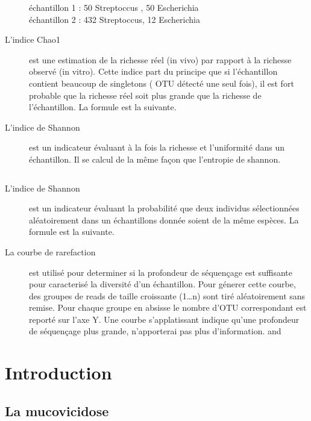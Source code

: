 \documentclass[12pt,a4paper]{article}
\begin{document}
\begin{description}
échantillon 1  : 50 Streptoccus , 50 Escherichia  \\ 
échantillon 2 : 432 Streptoccus, 12 Escherichia 


\item[L'indice Chao1] est une estimation de la richesse réel (in vivo) par rapport à la richesse observé (in vitro). Cette indice part du principe que si l’échantillon contient beaucoup de singletons ( OTU détecté une seul fois), il est fort probable que la richesse réel soit plus grande que la richesse de l’échantillon. La formule est la suivante.
\begin{equation}
\end{equation}


\item[L'indice de Shannon] est un indicateur évaluant à la fois la richesse et l’uniformité dans un échantillon. Il se calcul de la même façon que l’entropie de shannon.

\begin{equation}
\end{equation}

\item[L'indice de Shannon] est un indicateur évaluant la probabilité que deux individus sélectionnées aléatoirement dans un échantillons donnée soient de la même espèces. La formule est la suivante.

\item[La courbe de rarefaction] est utilisé pour determiner si la profondeur de séquençage est suffisante pour caracterisé la diversité d’un échantillon.
Pour génerer cette courbe, des groupes de reads de taille croissante (1…n) sont tiré aléatoirement sans remise. Pour chaque groupe en absisse le nombre d’OTU correspondant est reporté sur l’axe Y.
Une courbe s’applatissant indique qu’une profondeur de séquençage plus grande, n’apporterai pas plus d’information. \citep{Dickson2014} and \citep{Beck}

\end{description}

\setcounter{page}{1}

\section{Introduction}
\subsection{La mucovicidose}
\end{document}
